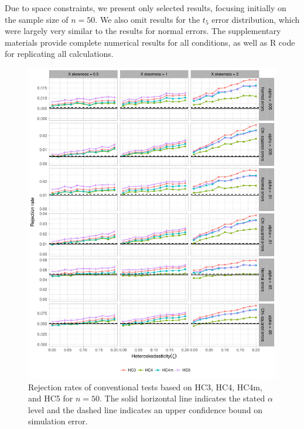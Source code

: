 \documentclass[12pt]{article}\usepackage[]{graphicx}\usepackage[]{color}
\newenvironment{knitrout}{}{} %
\begin{document}
Due to space constraints, we present only selected results, focusing initially on the sample size of $n = 50$. We also omit results for the $t_5$ error distribution, which were largely very similar to the results for normal errors. The supplementary materials provide complete numerical results for all conditions, as well as R code for replicating all calculations.

\begin{knitrout}
\color{fgcolor}\begin{figure}[p]

{\centering \includegraphics[width=\linewidth]{HC_fig/HC_size-1} 

}

\caption[Rejection rates of conventional tests based on HC3, HC4, HC4m, and HC5 for $n = 50$]{Rejection rates of conventional tests based on HC3, HC4, HC4m, and HC5 for $n = 50$. The solid horizontal line indicates the stated $\alpha$ level and the dashed line indicates an upper confidence bound on simulation error.}\label{fig:HC_size}
\end{figure}


\end{knitrout}
\end{document}
